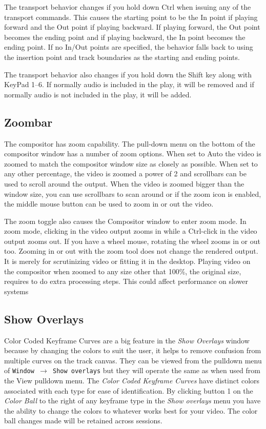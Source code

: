 The transport behavior changes if you hold down Ctrl when issuing any of the transport commands. This causes the starting point to be the In point if playing forward and the Out point if playing backward. If playing forward, the Out point becomes the ending point and if playing backward, the In point becomes the ending point. If no In/Out points are specified, the behavior falls back to using the insertion point and track boundaries as the starting and ending points.

The transport behavior also changes if you hold down the Shift key along with KeyPad 1--6.  
If normally audio is included in the play, it will be removed and if normally audio is not included in the play, it will be added.


\subsection{Zoombar}%
\label{sub:zoombar}

The compositor has zoom capability. 
The pull-down menu on the bottom of the compositor window has a number of zoom options. 
When set to Auto the video is zoomed to match the compositor window size as closely as possible. 
When set to any other percentage, the video is zoomed a power of 2 and scrollbars can be used to scroll around the output. 
When the video is zoomed bigger than the window size,  you can use scrollbars to scan around or if the zoom icon is enabled, the middle mouse button can be used to zoom in or out the video.

The zoom toggle also causes the Compositor window to enter zoom mode. 
In zoom mode, clicking in the video output zooms in while a Ctrl-click in the video output zooms out. 
If you have a wheel mouse, rotating the wheel zooms in or out too. 
Zooming in or out with the zoom tool does not change the rendered output. 
It is merely for scrutinizing video or fitting it in the desktop. Playing video on the compositor when zoomed to any size other that 100\%, the original size, requires \CGG{} to do extra processing steps. 
This could affect performance on slower systems

\subsection{Show Overlays}%
\label{sub:show_overlays}

Color Coded Keyframe Curves are a big feature in the \textit{Show Overlays} window because by changing the colors to suit the user, it helps to remove confusion from multiple curves on the track canvas.  
They can be viewed from the pulldown menu of \texttt{Window $\rightarrow$ Show overlays} but they will operate the same as when used from the View pulldown menu.  
The \textit{Color Coded Keyframe Curves} have distinct colors associated with each type for ease of identification.  
By clicking button 1 on the \textit{Color Ball} to the right of any keyframe type in the \textit{Show overlays} menu you have the ability to change the colors to whatever works best for your video.  
The color ball changes made will be retained across sessions.

